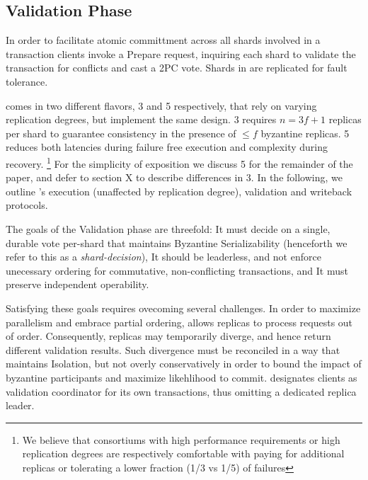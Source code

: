\subsection{Validation Phase}

In order to facilitate atomic committment across all shards involved in a transaction \sys clients invoke a Prepare request, inquiring each shard to validate the transaction for conflicts and cast a 2PC vote. Shards in \sys are replicated for fault tolerance.

\sys comes in two different flavors, \sys{}3 and \sys{}5 respectively, that rely on varying replication degrees, but implement the same design. \sys{}3 requires $n=3f+1$ replicas  per shard to guarantee consistency in the presence of $\leq f$ byzantine replicas. \sys{}5 reduces both latencies during failure free execution and complexity during recovery. \footnote{We believe that consortiums with high performance requirements or high replication degrees are respectively comfortable with paying for additional replicas or tolerating a lower fraction (1/3 vs 1/5) of failures}
For the simplicity of exposition we discuss \sys{}5 for the remainder of the paper, and defer to section X  to describe differences in \sys{}3. In the following, we outline \sys 's execution (unaffected by replication degree), validation and writeback protocols.

The goals of the Validation phase are threefold: \one It must decide on a single, durable vote per-shard that maintains Byzantine Serializability (henceforth we refer to this as a \textit{shard-decision}), \two It should be leaderless, and not enforce unecessary ordering for commutative, non-conflicting transactions, and \three It must preserve independent operability. 

Satisfying these goals requires ovecoming several challenges. In order to maximize parallelism and embrace partial ordering, \sys allows replicas to process requests out of order. Consequently, replicas may temporarily diverge, and hence return different validation results. Such divergence must be reconciled in a way that maintains Isolation, but not overly conservatively in order to bound the impact of byzantine participants and maximize likehlihood to commit. \sys designates clients as validation coordinator for its own transactions, thus omitting a dedicated replica leader. %

